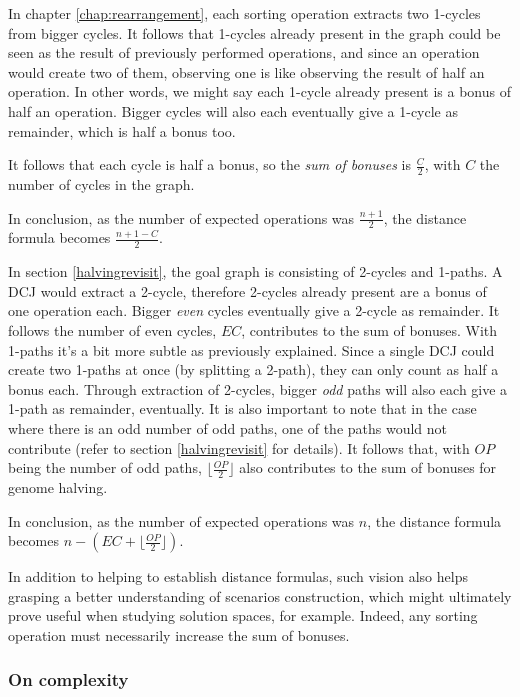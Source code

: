 \documentclass[11pt,final,twoside,nofrench]{thlifl}
\begin{document}
In chapter \ref{chap:rearrangement}, each sorting operation extracts two 1-cycles from bigger cycles. It follows that 1-cycles already present in the graph could be seen as the result of previously performed operations, and since an operation would create two of them, observing one is like observing the result of half an operation. In other words, we might say each 1-cycle already present is a bonus of half an operation. Bigger cycles will also each eventually give a 1-cycle as remainder, which is half a bonus too. 

It follows that each cycle is half a bonus, so the \emph{sum of bonuses} is $\frac{C}{2}$, with $C$ the number of cycles in the graph.

In conclusion, as the number of expected operations was $\frac{n+1}{2}$, the distance formula becomes $\frac{n+1-C}{2}$.

In section \ref{halvingrevisit}, the goal graph is consisting of 2-cycles and 1-paths. A DCJ would extract a 2-cycle, therefore 2-cycles already present are a bonus of one operation each. Bigger \emph{even} cycles eventually give a 2-cycle as remainder. It follows the number of even cycles, $EC$, contributes to the sum of bonuses.
 With 1-paths it's a bit more subtle as previously explained. Since a single DCJ could create two 1-paths at once (by splitting a 2-path), they can only count as half a bonus each. Through extraction of 2-cycles, bigger \emph{odd} paths will also each give a 1-path as remainder, eventually. It is also important to note that in the case where there is an odd number of odd paths, one of the paths would not contribute (refer to section \ref{halvingrevisit} for details). It follows that, with $OP$ being the number of odd paths, $\lfloor \frac{OP}{2} \rfloor$ also contributes to the sum of bonuses for genome halving.

In conclusion, as the number of expected operations was $n$, the distance formula becomes $n - (EC + \lfloor \frac{OP}{2} \rfloor )$.

In addition to helping to establish distance formulas, such vision also helps grasping a better understanding of scenarios construction, which might ultimately prove useful when studying solution spaces, for example. Indeed, any sorting operation must necessarily increase the sum of bonuses.

\subsubsection{On complexity}
\end{document}
